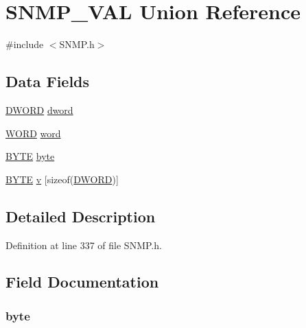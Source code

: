 \hypertarget{union_s_n_m_p___v_a_l}{}\section{S\+N\+M\+P\+\_\+\+V\+A\+L Union Reference}
\label{union_s_n_m_p___v_a_l}


{\ttfamily \#include $<$S\+N\+M\+P.\+h$>$}

\subsection*{Data Fields}
\begin{DoxyCompactItemize}
\item 
\hyperlink{_generic_type_defs_8h_ad342ac907eb044443153a22f964bf0af}{D\+W\+O\+R\+D} \hyperlink{union_s_n_m_p___v_a_l_acc4df36cf50672e0d8bfd4f0fd33bc75}{dword}
\item 
\hyperlink{_generic_type_defs_8h_a2b0e863dadf920709ec53d9088ee7c91}{W\+O\+R\+D} \hyperlink{union_s_n_m_p___v_a_l_ac5d0442b48217080ee07971744b74011}{word}
\item 
\hyperlink{_generic_type_defs_8h_a4ae1dab0fb4b072a66584546209e7d58}{B\+Y\+T\+E} \hyperlink{union_s_n_m_p___v_a_l_a4ec262e8432e722273b67cea923f72a6}{byte}
\item 
\hyperlink{_generic_type_defs_8h_a4ae1dab0fb4b072a66584546209e7d58}{B\+Y\+T\+E} \hyperlink{union_s_n_m_p___v_a_l_aceb98f68a6ef3b83de69a0b6f0736e9f}{v} \mbox{[}sizeof(\hyperlink{_generic_type_defs_8h_ad342ac907eb044443153a22f964bf0af}{D\+W\+O\+R\+D})\mbox{]}
\end{DoxyCompactItemize}


\subsection{Detailed Description}


Definition at line 337 of file S\+N\+M\+P.\+h.



\subsection{Field Documentation}
\hypertarget{union_s_n_m_p___v_a_l_a4ec262e8432e722273b67cea923f72a6}{}
\subsubsection[{byte}]{ byte}\label{union_s_n_m_p___v_a_l_a4ec262e8432e722273b67cea923f72a6}


